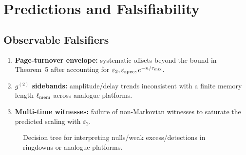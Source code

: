 \documentclass[11pt,a4paper]{article}
\theoremstyle{plain}
\theoremstyle{definition}
\theoremstyle{remark}
\begin{document}
\section{Predictions and Falsifiability}
\label{sec:predictions}

\subsection{Observable Falsifiers}
\begin{enumerate}
  \item \textbf{Page-turnover envelope:} systematic offsets beyond the bound in
        Theorem~5 after accounting for \(\varepsilon_2,\varepsilon_{\mathrm{spec}},e^{-n/\tau_{\rm mix}}\).
  \item \textbf{$g^{(2)}$ sidebands:} amplitude/delay trends inconsistent with a finite
        memory length \(\ell_{\rm mem}\) across analogue platforms.
  \item \textbf{Multi-time witnesses:} failure of non-Markovian witnesses to saturate
        the predicted scaling with \(\varepsilon_2\).
\end{enumerate}

\begin{figure}[t]
  \centering
  \caption{Decision tree for interpreting nulls/weak excess/detections in ringdowns or analogue platforms.}
  \label{fig:decision-tree}
\end{figure}
\end{document}
